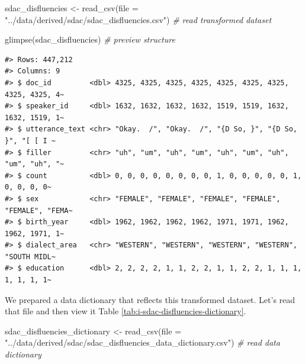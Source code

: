 \documentclass[
]{article}
\newenvironment{Shaded}{\begin{snugshade}}{\end{snugshade}}
\newcommand{\AttributeTok}[1]{\textcolor[rgb]{0.77,0.63,0.00}{#1}}
\newcommand{\CommentTok}[1]{\textcolor[rgb]{0.56,0.35,0.01}{\textit{#1}}}
\newcommand{\FunctionTok}[1]{\textcolor[rgb]{0.00,0.00,0.00}{#1}}
\newcommand{\NormalTok}[1]{#1}
\newcommand{\OtherTok}[1]{\textcolor[rgb]{0.56,0.35,0.01}{#1}}
\newcommand{\StringTok}[1]{\textcolor[rgb]{0.31,0.60,0.02}{#1}}
\begin{document}
\begin{Shaded}
\begin{Highlighting}[]
\NormalTok{sdac\_disfluencies }\OtherTok{\textless{}{-}} \FunctionTok{read\_csv}\NormalTok{(}\AttributeTok{file =} \StringTok{"../data/derived/sdac/sdac\_disfluencies.csv"}\NormalTok{)  }\CommentTok{\# read transformed dataset}

\FunctionTok{glimpse}\NormalTok{(sdac\_disfluencies)  }\CommentTok{\# preview structure}
\end{Highlighting}
\end{Shaded}

\begin{verbatim}
#> Rows: 447,212
#> Columns: 9
#> $ doc_id         <dbl> 4325, 4325, 4325, 4325, 4325, 4325, 4325, 4325, 4325, 4~
#> $ speaker_id     <dbl> 1632, 1632, 1632, 1632, 1519, 1519, 1632, 1632, 1519, 1~
#> $ utterance_text <chr> "Okay.  /", "Okay.  /", "{D So, }", "{D So, }", "[ [ I ~
#> $ filler         <chr> "uh", "um", "uh", "um", "uh", "um", "uh", "um", "uh", "~
#> $ count          <dbl> 0, 0, 0, 0, 0, 0, 0, 0, 1, 0, 0, 0, 0, 0, 1, 0, 0, 0, 0~
#> $ sex            <chr> "FEMALE", "FEMALE", "FEMALE", "FEMALE", "FEMALE", "FEMA~
#> $ birth_year     <dbl> 1962, 1962, 1962, 1962, 1971, 1971, 1962, 1962, 1971, 1~
#> $ dialect_area   <chr> "WESTERN", "WESTERN", "WESTERN", "WESTERN", "SOUTH MIDL~
#> $ education      <dbl> 2, 2, 2, 2, 1, 1, 2, 2, 1, 1, 2, 2, 1, 1, 1, 1, 1, 1, 1~
\end{verbatim}

We prepared a data dictionary that reflects this transformed dataset. Let's read that file and then view it Table \ref{tab:i-sdac-disfluencies-dictionary}.

\begin{Shaded}
\begin{Highlighting}[]
\NormalTok{sdac\_disfluencies\_dictionary }\OtherTok{\textless{}{-}} \FunctionTok{read\_csv}\NormalTok{(}\AttributeTok{file =} \StringTok{"../data/derived/sdac/sdac\_disfluencies\_data\_dictionary.csv"}\NormalTok{)  }\CommentTok{\# read data dictionary}
\end{Highlighting}
\end{Shaded}
\end{document}
